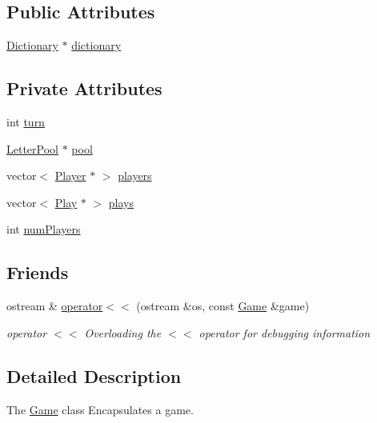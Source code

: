 \subsection*{Public Attributes}
\begin{DoxyCompactItemize}
\item 
\hyperlink{class_dictionary}{Dictionary} $\ast$ \hyperlink{class_game_ac02ac16d33949edb2c83b9c6ce48e596}{dictionary}
\end{DoxyCompactItemize}
\subsection*{Private Attributes}
\begin{DoxyCompactItemize}
\item 
int \hyperlink{class_game_aef6ba37517324fc3469dfa65d6f92d21}{turn}
\item 
\hyperlink{class_letter_pool}{Letter\-Pool} $\ast$ \hyperlink{class_game_ae3b2cb6cd3fd8cf83dc8cd8a6068487a}{pool}
\item 
vector$<$ \hyperlink{class_player}{Player} $\ast$ $>$ \hyperlink{class_game_a8b1b6150488acf6e0d3a222dbf359842}{players}
\item 
vector$<$ \hyperlink{class_play}{Play} $\ast$ $>$ \hyperlink{class_game_a358b65cc87708ae0fe5793bae968971f}{plays}
\item 
int \hyperlink{class_game_a7c03c2f209dfde4ef01c739b050159f6}{num\-Players}
\end{DoxyCompactItemize}
\subsection*{Friends}
\begin{DoxyCompactItemize}
\item 
ostream \& \hyperlink{class_game_a41c0344e76853337b335ed0cb6df12ec}{operator$<$$<$} (ostream \&os, const \hyperlink{class_game}{Game} \&game)
\begin{DoxyCompactList}\small\item\em operator $<$$<$ Overloading the $<$$<$ operator for debugging information \end{DoxyCompactList}\end{DoxyCompactItemize}


\subsection{Detailed Description}
The \hyperlink{class_game}{Game} class Encapsulates a game. 


